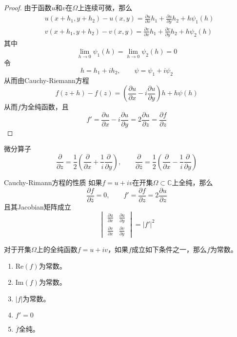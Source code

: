 \documentclass[lang = cn, scheme = chinese, thmcnt = section]{elegantbook}
\newcommand{\C}{\mathbb{C}}  		   %
\newcommand{\sub}{\subset}             %
\begin{document}
\begin{proof}
	由于函数$u$和$v$在$\Omega$​上连续可微，那么
	\begin{align*}
		& u(x+h_1,y+h_2)-u(x,y)=\frac{\partial u}{\partial x}h_1+\frac{\partial u}{\partial y}h_2+h\psi_1(h)\\
		& v(x+h_1,y+h_2)-v(x,y)=\frac{\partial v}{\partial x}h_1+\frac{\partial v}{\partial y}h_2+h\psi_2(h)
	\end{align*}
	其中%
	$$
	\lim_{h\to 0}\psi_1(h)=\lim_{h\to 0}\psi_2(h)=0
	$$
	令%
	$$
	h=h_1+ih_2,\qquad 
	\psi=\psi_1+i\psi_2
	$$
	从而由Cauchy-Riemann方程%
	$$
	f(z+h)-f(z)
	=\left(\frac{\partial u}{\partial x}-i\frac{\partial u}{\partial y}\right)h+h\psi(h)
	$$
	从而$f$为全纯函数，且%
	$$
	f'=\frac{\partial u}{\partial x}-i\frac{\partial u}{\partial y}=2\frac{\partial u}{\partial z}=\frac{\partial f}{\partial z}
	$$
\end{proof}

\begin{definition}{微分算子}
	$$
	\frac{\partial }{\partial z}=\frac{1}{2}\left(\frac{\partial }{\partial x}+\frac{1}{i}\frac{\partial }{\partial y}\right),
	\qquad
	\frac{\partial }{\partial \bar{z}}=\frac{1}{2}\left(\frac{\partial }{\partial x}-\frac{1}{i}\frac{\partial }{\partial y}\right)
	$$
\end{definition}

\begin{proposition}{}{Cauchy-Rimann方程的性质}
	如果$f=u+iv$在开集$\Omega\sub\C$上全纯，那么%
	$$
	\frac{\partial f}{\partial \bar{z}}=0,\qquad 
	f'=\frac{\partial f}{\partial z}=2\frac{\partial u}{\partial z}
	$$
	且其Jacobian矩阵成立%
	$$
	\begin{vmatrix}
		\frac{\partial u}{\partial x}&\frac{\partial u}{\partial y}\\
		\frac{\partial v}{\partial x}&\frac{\partial v}{\partial y}
	\end{vmatrix}=|f'|^2
	$$
\end{proposition}

\begin{proposition}
	对于开集$\Omega$上的全纯函数$f=u+iv$，如果$f$成立如下条件之一，那么$f$为常数。
	\begin{enumerate}
		\item $\mathrm{Re}(f)$为常数。
		\item $\mathrm{Im}(f)$为常数。
		\item $|f|$为常数。
		\item $f'=0$
		\item $\overline{f}$全纯。
	\end{enumerate}
\end{proposition}
\end{document}
